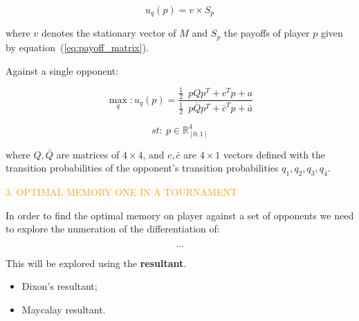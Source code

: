 \documentclass[usenames,dvipsnames,t]{beamer}
\newcommand{\R}{\mathbb{R}}
\begin{document}
\begin{columns}
\begin{column}{.4\linewidth}
            \[u_q(p) = v \times S_{p}\]
            \vspace{0.3cm}

        where \(v\) denotes the stationary vector of \(M\) and \(S_{p}\) the payoffs of
        player \(p\) given by equation~(\ref{eq:payoff_matrix}).
        \vspace{0.5cm}

        \textcolor{solarizedGreen}{Against a single opponent:}
        \vspace{0.3cm}

        \[\max_q: u_q(p) = \frac{\frac{1}{2}\enspace p  Q  p^T + c^T p + a} 
                        {\frac{1}{2}\enspace  p  \bar{Q}  p^T + \bar{c}^T  p + \bar{a}}\]

         \[st:  \ p \in \R^4_{[0, 1]}\]
         \vspace{0.3cm}

        \small{
        where \(Q, \bar{Q}\) are matrices of \(4 \times 4\), and \(c, \bar{c}\) are 
        \(4 \times 1\) vectors  defined with the transition probabilities of the
        opponent's transition probabilities \(q_1, q_2, q_3, q_4\).}
    \vspace{2cm}

    \textcolor{orange}{\large{3. OPTIMAL MEMORY ONE IN A TOURNAMENT}}
    \vspace{0.3cm}

    \small{
        In order to find the optimal memory on player against a set of opponents
        we need to explore the numeration of the differentiation of:
        \vspace{0.3cm}

        \[\dots\]

        \vspace{0.3cm}
        \small{
        This will be explored using the \textbf{resultant}.}

    }

    \begin{center}
        
    \end{center}

    \small{
        \begin{itemize}
            \item Dixon's resultant;
            \item Maycalay resultant.
        \end{itemize}
    }
    \end{column}


\end{columns}
\end{document}
